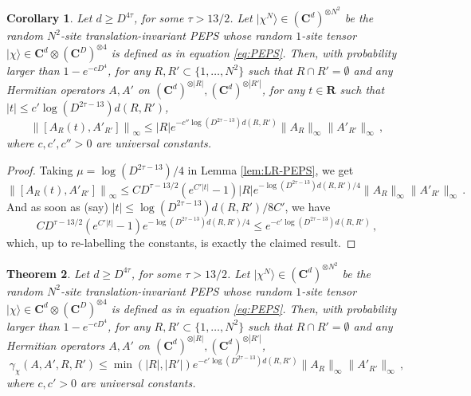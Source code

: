 \documentclass{amsart}
\newtheorem{theorem}{Theorem}[section]
\newtheorem{corollary}[theorem]{Corollary}
\newcommand{\R}{\mathbf{R}}
\newcommand{\C}{\mathbf{C}}
\renewcommand{\leq}{\leqslant}
\renewcommand{\geq}{\geqslant}
\newcommand{\ket}[1]{| #1 \rangle}
\begin{document}
\begin{corollary} \label{cor:LR-PEPS}
    Let $d\geq D^{4\tau}$, for some $\tau>13/2$. Let $\ket{\chi^N}\in(\C^d)^{\otimes N^2}$ be the random $N^2$-site translation-invariant PEPS whose random $1$-site tensor $\ket{\chi}\in\C^d\otimes(\C^D)^{\otimes 4}$ is defined as in equation \eqref{eq:PEPS}. Then, with probability larger than $1-e^{-cD^4}$, for any $R,R'\subset\{1,\ldots,N^2\}$ such that $R\cap R'=\emptyset$ and any Hermitian operators $A,A'$ on $(\C^d)^{\otimes |R|},(\C^d)^{\otimes |R'|}$, for any $t\in\R$ such that $|t|\leq c'\log(D^{2\tau-13})d(R,R')$,
    \[ \left\| \left[ A_R(t),A'_{R'} \right] \right\|_{\infty} \leq |R|e^{-c''\log(D^{2\tau-13}) d(R,R')} \|A_R\|_{\infty}\|A'_{R'}\|_{\infty} \, , \]
    where $c,c',c''>0$ are universal constants.
\end{corollary}

\begin{proof}
    Taking $\mu=\log(D^{2\tau-13})/4$ in Lemma \ref{lem:LR-PEPS}, we get
    \[ \left\| \left[ A_R(t),A'_{R'} \right] \right\|_{\infty} \leq CD^{\tau-13/2} \left( e^{C'|t|} -1 \right) |R|e^{-\log(D^{2\tau-13}) d(R,R')/4} \|A_R\|_{\infty}\|A'_{R'}\|_{\infty} \, . \]
    And as soon as (say) $|t|\leq \log(D^{2\tau-13}) d(R,R') /8C'$, we have
    \[ CD^{\tau-13/2} \left( e^{C'|t|} -1 \right)e^{-\log(D^{2\tau-13}) d(R,R')/4} \leq e^{-c'\log(D^{2\tau-13}) d(R,R')} \, , \]
    which, up to re-labelling the constants, is exactly the claimed result.
\end{proof}

\begin{theorem} \label{th:dc1'-PEPS}
    Let $d\geq D^{4\tau}$, for some $\tau>13/2$. Let $\ket{\chi^N}\in(\C^d)^{\otimes N^2}$ be the random $N^2$-site translation-invariant PEPS whose random $1$-site tensor $\ket{\chi}\in\C^d\otimes(\C^D)^{\otimes 4}$ is defined as in equation \eqref{eq:PEPS}. Then, with probability larger than $1-e^{-cD^4}$, for any $R,R'\subset\{1,\ldots,N^2\}$ such that $R\cap R'=\emptyset$ and any Hermitian operators $A,A'$ on $(\C^d)^{\otimes |R|},(\C^d)^{\otimes |R'|}$,
    \[ \gamma_{\chi}(A,A',R,R') \leq \min(|R|,|R'|)e^{-c'\log(D^{2\tau-13}) d(R,R')} \|A_R\|_{\infty}\|A'_{R'}\|_{\infty} \, , \]
    where $c,c'>0$ are universal constants.
\end{theorem}
\end{document}
